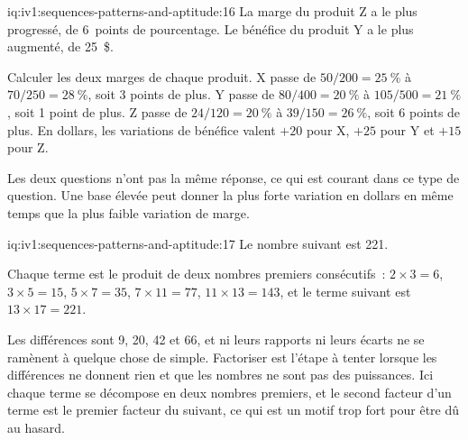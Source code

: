 \begin{solution}{iq:iv1:sequences-patterns-and-aptitude:16}
La marge du produit Z a le plus progressé, de 6~points de pourcentage. Le bénéfice du produit Y a le plus augmenté, de 25~\$.

Calculer les deux marges de chaque produit. X passe de $50/200 = 25~\%$ à $70/250 = 28~\%$, soit 3 points de plus. Y passe de $80/400 = 20~\%$ à $105/500 = 21~\%$, soit 1 point de plus. Z passe de $24/120 = 20~\%$ à $39/150 = 26~\%$, soit 6 points de plus. En dollars, les variations de bénéfice valent $+20$ pour X, $+25$ pour Y et $+15$ pour Z.

Les deux questions n'ont pas la même réponse, ce qui est courant dans ce type de question. Une base élevée peut donner la plus forte variation en dollars en même temps que la plus faible variation de marge.

\end{solution}

\begin{solution}{iq:iv1:sequences-patterns-and-aptitude:17}
Le nombre suivant est 221.

Chaque terme est le produit de deux nombres premiers consécutifs~: $2 \times 3 = 6$, $3 \times 5 = 15$, $5 \times 7 = 35$, $7 \times 11 = 77$, $11 \times 13 = 143$, et le terme suivant est $13 \times 17 = 221$.

Les différences sont 9, 20, 42 et 66, et ni leurs rapports ni leurs écarts ne se ramènent à quelque chose de simple. Factoriser est l'étape à tenter lorsque les différences ne donnent rien et que les nombres ne sont pas des puissances. Ici chaque terme se décompose en deux nombres premiers, et le second facteur d'un terme est le premier facteur du suivant, ce qui est un motif trop fort pour être dû au hasard.

\end{solution}

